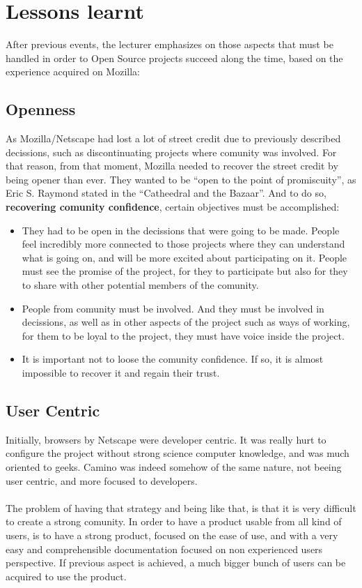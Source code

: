 \documentclass[11pt]{article}
\begin{document}
\section{Lessons learnt}
After previous events, the lecturer emphasizes on those aspects that must be handled in order to Open Source projects succeed along the time, based on the experience acquired on Mozilla:
\subsection{Openness}
As Mozilla/Netscape had lost a lot of street credit due to previously described decissions, such as discontinuating projects where comunity was involved. For that reason, from that moment, Mozilla needed to recover the street credit by being opener than ever. They wanted to be ``open to the point of promiscuity'', as Eric S. Raymond stated in the ``Catheedral and the Bazaar''. And to do so, \textbf{recovering comunity confidence}, certain objectives must be accomplished:
\begin{itemize}\itemsep0pt
\item{They had to be open in the decissions that were going to be made}. People feel incredibly more connected to those projects where they can understand what is going on, and will be more excited about participating on it. People must see the promise of the project, for they to participate but also for they to share with other potential members of the comunity.
\item{People from comunity must be involved}. And they must be involved in decissions, as well as in other aspects of the project such as ways of working, for them to be loyal to the project, they must have voice inside the project.
\item{It is important not to loose the comunity confidence}. If so, it is almost impossible to recover it and regain their trust.
\end{itemize}

\subsection{User Centric}
Initially, browsers by Netscape were developer centric. It was really hurt to configure the project without strong science computer knowledge, and was much oriented to geeks. 
Camino was indeed somehow of the same nature, not beeing user centric, and more focused to developers.\\
\\
The problem of having that strategy and being like that, is that it is very difficult to create a strong comunity. In order to have a product usable from all kind of users, is to have a strong product, focused on the ease of use, and with a very easy and comprehensible documentation focused on non experienced users perspective. If previous aspect is achieved, a much bigger bunch of users can be acquired to use the product.
\end{document}
